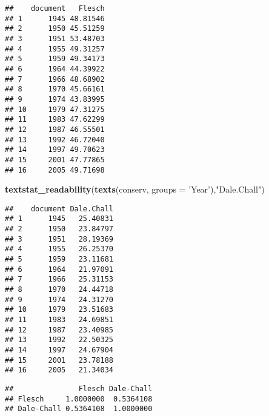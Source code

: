 \documentclass[]{article}
\newenvironment{Shaded}{\begin{snugshade}}{\end{snugshade}}
\newcommand{\KeywordTok}[1]{\textcolor[rgb]{0.13,0.29,0.53}{\textbf{#1}}}
\newcommand{\DataTypeTok}[1]{\textcolor[rgb]{0.13,0.29,0.53}{#1}}
\newcommand{\StringTok}[1]{\textcolor[rgb]{0.31,0.60,0.02}{#1}}
\newcommand{\OperatorTok}[1]{\textcolor[rgb]{0.81,0.36,0.00}{\textbf{#1}}}
\newcommand{\NormalTok}[1]{#1}
\begin{document}
\begin{verbatim}
##    document   Flesch
## 1      1945 48.81546
## 2      1950 45.51259
## 3      1951 53.48703
## 4      1955 49.31257
## 5      1959 49.34173
## 6      1964 44.39922
## 7      1966 48.68902
## 8      1970 45.66161
## 9      1974 43.83995
## 10     1979 47.31275
## 11     1983 47.62299
## 12     1987 46.55501
## 13     1992 46.72040
## 14     1997 49.70623
## 15     2001 47.77865
## 16     2005 49.71698
\end{verbatim}

\begin{Shaded}
\begin{Highlighting}[]
\KeywordTok{textstat_readability}\NormalTok{(}\KeywordTok{texts}\NormalTok{(conserv, }\DataTypeTok{groups =} \StringTok{'Year'}\NormalTok{),}\StringTok{"Dale.Chall"}\NormalTok{)}
\end{Highlighting}
\end{Shaded}

\begin{verbatim}
##    document Dale.Chall
## 1      1945   25.40831
## 2      1950   23.84797
## 3      1951   28.19369
## 4      1955   26.25370
## 5      1959   23.11681
## 6      1964   21.97091
## 7      1966   25.31153
## 8      1970   24.44718
## 9      1974   24.31270
## 10     1979   23.51683
## 11     1983   24.69851
## 12     1987   23.40985
## 13     1992   22.50325
## 14     1997   24.67904
## 15     2001   23.78188
## 16     2005   21.34034
\end{verbatim}

\begin{Shaded}
\end{Shaded}

\begin{verbatim}
##               Flesch Dale-Chall
## Flesch     1.0000000  0.5364108
## Dale-Chall 0.5364108  1.0000000
\end{verbatim}
\end{document}
